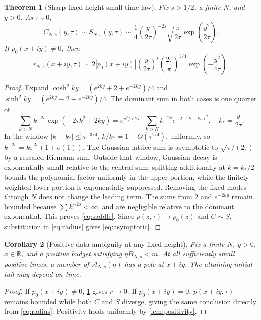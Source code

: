 \documentclass[11pt]{article}
\newtheorem{theorem}{Theorem}\newtheorem{proposition}[theorem]{Proposition}\newtheorem{corollary}[theorem]{Corollary}\newtheorem{lemma}[theorem]{Lemma}\theoremstyle{remark}\newtheorem{remark}[theorem]{Remark}
\newcommand{\R}{\mathbb R}\newcommand{\C}{\mathbb C}\newcommand{\T}{\mathbb T}\newcommand{\norm}[1]{\left\lVert #1\right\rVert}\newcommand{\range}{\operatorname{range}}
\begin{document}
\begin{theorem}[Sharp fixed-height small-time law]\label{thm:asymptotic}
Fix $s>1/2$, a finite $N$, and $y>0$. As $\tau\downarrow0$,
\begin{equation}\label{eq:saddle}
 C_{N,s}(y,\tau)\sim S_{N,s}(y,\tau)
 \sim\frac14\left(\frac{y}{2\tau}\right)^{-2s}
 \sqrt{\frac{\pi}{2\tau}}\exp\left(\frac{y^2}{2\tau}\right).
\end{equation}
If $p_0(x+iy)\ne0$, then
\begin{equation}\label{eq:asymptotic}
 r_{N,s}(x+iy,\tau)\sim
 2|p_0(x+iy)|\left(\frac{y}{2\tau}\right)^s
 \left(\frac{2\tau}{\pi}\right)^{1/4}
 \exp\left(-\frac{y^2}{4\tau}\right).
\end{equation}
\end{theorem}
\begin{proof}
Expand $\cosh^2ky=(e^{2ky}+2+e^{-2ky})/4$ and $\sinh^2ky=(e^{2ky}-2+e^{-2ky})/4$. The dominant sum in both cases is one quarter of
\[
 \sum_{k>N}k^{-2s}\exp(-2\tau k^2+2ky)
 =e^{y^2/(2\tau)}\sum_{k>N}k^{-2s}e^{-2\tau(k-k_*)^2},\quad k_*=\frac{y}{2\tau}.
\]
In the window $|k-k_*|\le\tau^{-3/4}$, $k/k_*=1+O(\tau^{1/4})$, uniformly, so $k^{-2s}=k_*^{-2s}(1+o(1))$. The Gaussian lattice sum is asymptotic to $\sqrt{\pi/(2\tau)}$ by a rescaled Riemann sum. Outside that window, Gaussian decay is exponentially small relative to the central sum: splitting additionally at $k=k_*/2$ bounds the polynomial factor uniformly in the upper portion, while the finitely weighted lower portion is exponentially suppressed. Removing the fixed modes through $N$ does not change the leading term. The sums from $2$ and $e^{-2ky}$ remain bounded because $\sum k^{-2s}<\infty$, and are negligible relative to the dominant exponential. This proves \eqref{eq:saddle}. Since $p(z,\tau)\to p_0(z)$ and $C\sim S$, substitution in \eqref{eq:radius} gives \eqref{eq:asymptotic}.
\end{proof}

\begin{corollary}[Positive-data ambiguity at any fixed height]\label{cor:ambiguity}
Fix a finite $N$, $y>0$, $x\in\R$, and a positive budget satisfying $\eta B_{N,s}<m$. At all sufficiently small positive times, a member of $\mathcal A_{N,s}(\eta)$ has a pole at $x+iy$. The attaining initial tail may depend on time.
\end{corollary}
\begin{proof}
If $p_0(x+iy)\ne0$, \cref{thm:asymptotic} gives $r\to0$. If $p_0(x+iy)=0$, $p(x+iy,\tau)$ remains bounded while both $C$ and $S$ diverge, giving the same conclusion directly from \eqref{eq:radius}. Positivity holds uniformly by \cref{lem:positivity}.
\end{proof}
\end{document}
